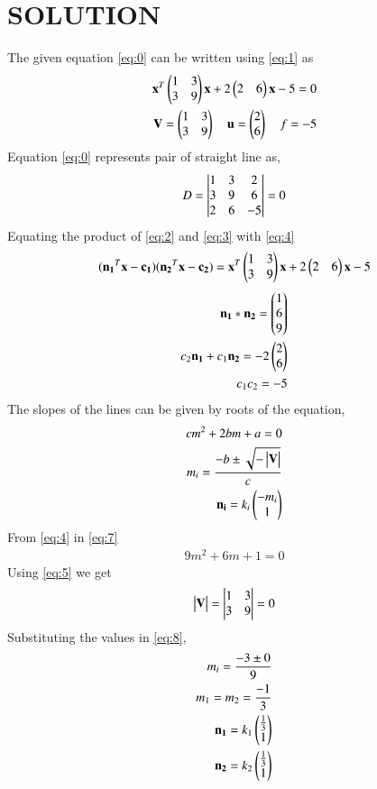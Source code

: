 \documentclass[journal,12pt,twocolumn]{IEEEtran}
\begin{document}
\section{SOLUTION}
The given equation \eqref{eq:0} can be written using \eqref{eq:1} as
\begin{align}
\mathbf{x}^T\begin{pmatrix}1 & 3 \\ 3 & 9\end{pmatrix}\mathbf{x} +2\begin{pmatrix}2 &6\end{pmatrix}\mathbf{x}-5=0\label{eq:4}\\
\mathbf{V} = \begin{pmatrix}1 & 3 \\ 3 & 9\end{pmatrix} \quad \mathbf{u} = \begin{pmatrix}2 \\ 6\end{pmatrix} \quad f= -5 \label{eq:5}
\end{align}
Equation \eqref{eq:0} represents pair of straight line as,
\begin{align}
D = \begin{vmatrix}1&3&2\\3&9&6\\2&6&-5\end{vmatrix} = 0
\end{align}
Equating the product of \eqref{eq:2} and \eqref{eq:3} with \eqref{eq:4}
\begin{align}
(\mathbf{n_1}^T\mathbf{x} -\mathbf{c_1})(\mathbf{n_2}^T\mathbf{x} - \mathbf{c_2})= \mathbf{x}^T\begin{pmatrix}1 & 3 \\ 3 & 9\end{pmatrix}\mathbf{x} +2\begin{pmatrix}2 &6\end{pmatrix}\mathbf{x}-5
\end{align}
\begin{align}
\mathbf{n_1}*\mathbf{n_2}=\begin{pmatrix}1\\6\\9\end{pmatrix}\label{eq:6}\\
c_2\mathbf{n_1}+c_1\mathbf{n_2} = -2\begin{pmatrix}2\\6\end{pmatrix}\\
c_1c_2 = -5
\end{align}
The slopes of the lines can be given by roots of the equation,
\begin{align} 
cm^2+2bm+a=0 \label{eq:7}\\
m_i = \frac{-b\pm \sqrt{-\begin{vmatrix}\mathbf{V}\end{vmatrix}}}{c}\label{eq:8}\\
\mathbf{n_i}=k_i\begin{pmatrix}-m_i\\1\end{pmatrix}
\end{align}
From \eqref{eq:4} in \eqref{eq:7}
\begin{align}
9m^2+6m+1=0
\end{align}
Using \eqref{eq:5} we get
\begin{align}
\begin{vmatrix}\mathbf{V}\end{vmatrix} = \begin{vmatrix}1 & 3\\ 3 & 9\end{vmatrix} = 0
\end{align}
Substituting the values in \eqref{eq:8},
\begin{align}
m_i = \frac{-3\pm 0}{9}\\
m_1= m_2 = \frac{-1}{3} \label{eq:9}\\
\mathbf{n_1}=k_1\begin{pmatrix}\frac{1}{3}\\1\end{pmatrix}\\
\mathbf{n_2}=k_2\begin{pmatrix}\frac{1}{3}\\1\end{pmatrix}
\end{align}
\end{document}
